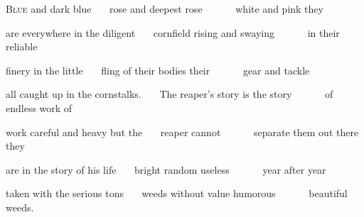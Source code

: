 \begin{poem}
\begin{stanza}
\textsc{Blue} and dark blue\verseline
~~~rose and deepest rose\verseline
~~~~~~white and pink they
\end{stanza}

\begin{stanza}
are everywhere in the diligent\verseline
~~~cornfield rising and swaying\verseline
~~~~~~in their reliable
\end{stanza}

\begin{stanza}
finery in the little\verseline
~~~fling of their bodies their\verseline
~~~~~~gear and tackle
\end{stanza}

\begin{stanza}
all caught up in the cornstalks.\verseline
~~~The reaper's story is the story\verseline
~~~~~~of endless work of
\end{stanza}

\begin{stanza}
work careful and heavy but the\verseline
~~~reaper cannot\verseline
~~~~~~separate them out there they
\end{stanza}

\begin{stanza}
are in the story of his life\verseline
~~~bright random useless\verseline
~~~~~~year after year
\end{stanza}

\begin{stanza}
taken with the serious tons\verseline
~~~weeds without value humorous\verseline
~~~~~~beautiful weeds.
\end{stanza}
\end{poem}

\newpage %


